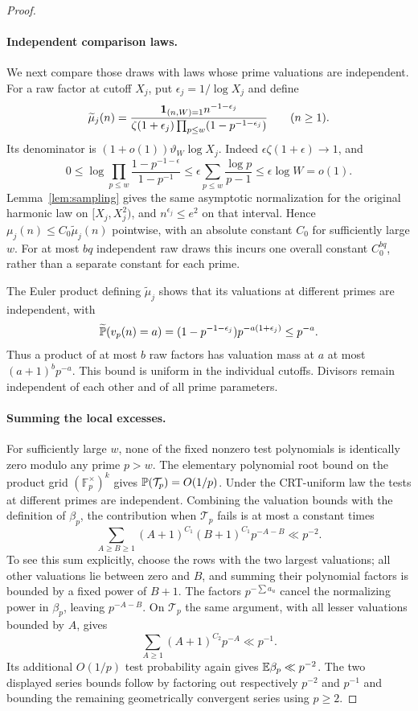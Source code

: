 \begin{proof}
\paragraph{Independent comparison laws.}
We next compare those draws with laws whose prime valuations are
independent.  For a raw factor at cutoff \(X_j\), put
\(\epsilon_j=1/\log X_j\) and define
\[
 \widetilde\mu_j(n)
  =\frac{\mathbf 1_{(n,W)=1}n^{-1-\epsilon_j}}{
    \zeta(1+\epsilon_j)\prod_{p\le w}(1-p^{-1-\epsilon_j})}
 \qquad(n\ge1).
\]
Its denominator is \((1+o(1))\vartheta_W\log X_j\).
Indeed \(\epsilon\zeta(1+\epsilon)\to1\), and
\[
 0\le\log\prod_{p\le w}
        \frac{1-p^{-1-\epsilon}}{1-p^{-1}}
 \le\epsilon\sum_{p\le w}\frac{\log p}{p-1}
 \le\epsilon\log W=o(1).
\]
Lemma~\ref{lem:sampling} gives the same asymptotic normalization
for the original harmonic law on \([X_j,X_j^2)\), and
\(n^{\epsilon_j}\le e^2\) on that interval.  Hence
\(\mu_j(n)\le C_0\widetilde\mu_j(n)\) pointwise, with an
absolute constant \(C_0\) for sufficiently large \(w\).
For at most \(bq\) independent raw draws this incurs one overall
constant \(C_0^{bq}\), rather than a separate constant for each
prime.

The Euler product defining \(\widetilde\mu_j\) shows that its
valuations at different primes are independent, with
\[
 \widetilde{\mathbb P}(v_p(n)=a)
    =(1-p^{-1-\epsilon_j})p^{-a(1+\epsilon_j)}
    \le p^{-a}.
\]
Thus a product of at most \(b\) raw factors has valuation mass
at \(a\) at most \((a+1)^b p^{-a}\).  This bound is uniform
in the individual cutoffs.  Divisors remain independent of each
other and of all prime parameters.

\paragraph{Summing the local excesses.}
For sufficiently large \(w\), none of the fixed nonzero test
polynomials is identically zero modulo any prime \(p>w\).
The elementary polynomial root bound on the product grid
\((\mathbb F_p^\times)^k\) gives
\(\mathbb P(\mathcal T_p)=O(1/p)\).  Under the CRT-uniform law the
tests at different primes are independent.  Combining the valuation
bounds with the definition of \(\beta_p\), the contribution when
\(\mathcal T_p\) fails is at most a constant times
\[
 \sum_{A\ge B\ge1}
  (A+1)^{C_1}(B+1)^{C_1}p^{-A-B}
 \ll p^{-2}.
\]
To see this sum explicitly, choose the rows with the two largest
valuations; all other valuations lie between zero and \(B\),
and summing their polynomial factors is bounded by a fixed power
of \(B+1\).  The factors \(p^{-\sum a_u}\) cancel the
normalizing power in \(\beta_p\), leaving \(p^{-A-B}\).
On \(\mathcal T_p\) the same argument, with all lesser
valuations bounded by \(A\), gives
\[
 \sum_{A\ge1}(A+1)^{C_2}p^{-A}\ll p^{-1}.
\]
Its additional \(O(1/p)\) test probability again gives
\(\mathbb E\beta_p\ll p^{-2}\).  The two displayed series bounds
follow by factoring out respectively \(p^{-2}\) and \(p^{-1}\)
and bounding the remaining geometrically convergent series using
\(p\ge2\).


\end{proof}
